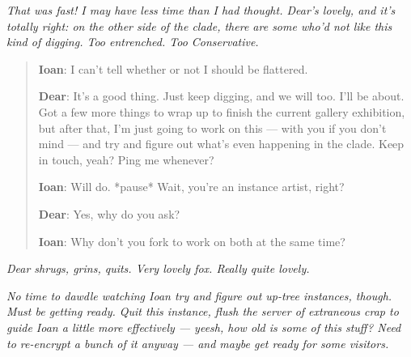 \emph{That was fast! I may have less time than I had thought. Dear's lovely, and it's totally right: on the other side of the clade, there are some who'd not like this kind of digging. Too entrenched. Too Conservative.}

\begin{quote}
\textbf{Ioan}: I can't tell whether or not I should be flattered.

\textbf{Dear}: It's a good thing. Just keep digging, and we will too. I'll be about. Got a few more things to wrap up to finish the current gallery exhibition, but after that, I'm just going to work on this --- with you if you don't mind --- and try and figure out what's even happening in the clade. Keep in touch, yeah? Ping me whenever?

\textbf{Ioan}: Will do. *pause* Wait, you're an instance artist, right?

\textbf{Dear}: Yes, why do you ask?

\textbf{Ioan}: Why don't you fork to work on both at the same time?
\end{quote}

\emph{Dear shrugs, grins, quits. Very lovely fox. Really quite lovely.}

\emph{No time to dawdle watching Ioan try and figure out up-tree instances, though. Must be getting ready. Quit this instance, flush the server of extraneous crap to guide Ioan a little more effectively --- yeesh, how old is some of this stuff? Need to re-encrypt a bunch of it anyway --- and maybe get ready for some visitors.}
